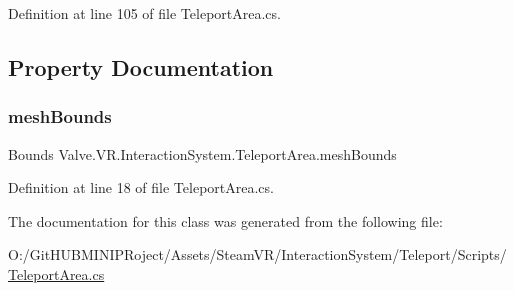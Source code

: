 Definition at line 105 of file Teleport\+Area.\+cs.



\subsection{Property Documentation}
\mbox{\label{class_valve_1_1_v_r_1_1_interaction_system_1_1_teleport_area_afead28060d4c08c26ddcc243eeac3c2d}} 
\subsubsection{\texorpdfstring{meshBounds}{meshBounds}}
{\footnotesize\ttfamily Bounds Valve.\+V\+R.\+Interaction\+System.\+Teleport\+Area.\+mesh\+Bounds\hspace{0.3cm}{\ttfamily [get]}}



Definition at line 18 of file Teleport\+Area.\+cs.



The documentation for this class was generated from the following file\+:\begin{DoxyCompactItemize}
\item 
O\+:/\+Git\+H\+U\+B\+M\+I\+N\+I\+P\+Roject/\+Assets/\+Steam\+V\+R/\+Interaction\+System/\+Teleport/\+Scripts/\mbox{\hyperlink{_teleport_area_8cs}{Teleport\+Area.\+cs}}\end{DoxyCompactItemize}
